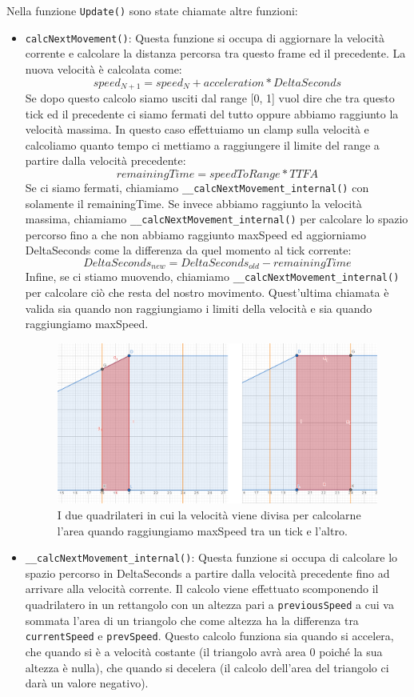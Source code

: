 \documentclass[main.tex]{subfiles}
\begin{document}
Nella funzione \lstinline{Update()} sono state chiamate altre funzioni:
\begin{itemize}
    \item \lstinline{calcNextMovement()}: Questa funzione si occupa di aggiornare la velocità corrente e calcolare la distanza percorsa tra questo frame ed il precedente. La nuova velocità è calcolata come:
    \[speed_{N+1} = speed_{N} + acceleration * DeltaSeconds\]
    Se dopo questo calcolo siamo usciti dal range [0, 1] vuol dire che tra questo tick ed il precedente ci siamo fermati del tutto oppure abbiamo raggiunto la velocità massima. In questo caso effettuiamo un clamp sulla velocità e calcoliamo quanto tempo ci mettiamo a raggiungere il limite del range a partire dalla velocità precedente:
    \[remainingTime = speedToRange * TTFA\]
    Se ci siamo fermati, chiamiamo \lstinline{__calcNextMovement_internal()} con solamente il remainingTime. Se invece abbiamo raggiunto la velocità massima, chiamiamo \lstinline{__calcNextMovement_internal()} per calcolare lo spazio percorso fino a che non abbiamo raggiunto maxSpeed ed aggiorniamo DeltaSeconds come la differenza da quel momento al tick corrente:
    \[DeltaSeconds_{new} = DeltaSeconds_{old} - remainingTime\]
    Infine, se ci stiamo muovendo, chiamiamo \lstinline{__calcNextMovement_internal()} per calcolare ciò che resta del nostro movimento. Quest'ultima chiamata è valida sia quando non raggiungiamo i limiti della velocità e sia quando raggiungiamo maxSpeed.
    \begin{figure}[H]
        \centering
        \includegraphics[width=.8\linewidth]{img/interpolazione/calcNextMovementLateCall.png}
        \caption{I due quadrilateri in cui la velocità viene divisa per calcolarne l'area quando raggiungiamo maxSpeed tra un tick e l'altro.}
        \label{fig:4_calcNextMovementLateCall}
    \end{figure}
    \item \lstinline{__calcNextMovement_internal()}: Questa funzione si occupa di calcolare lo spazio percorso in DeltaSeconds a partire dalla velocità precedente fino ad arrivare alla velocità corrente. Il calcolo viene effettuato scomponendo il quadrilatero in un rettangolo con un altezza pari a \lstinline{previousSpeed} a cui va sommata l'area di un triangolo che come altezza ha la differenza tra \lstinline{currentSpeed} e \lstinline{prevSpeed}. Questo calcolo funziona sia quando si accelera, che quando si è a velocità costante (il triangolo avrà area 0 poiché la sua altezza è nulla), che quando si decelera (il calcolo dell'area del triangolo ci darà un valore negativo).

\end{itemize}
\end{document}
